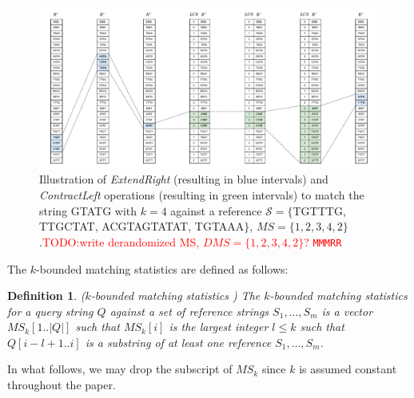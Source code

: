 \documentclass[unnumsec,webpdf,contemporary,large]{oup-authoring-template}%
\theoremstyle{thmstyleone}%
\theoremstyle{thmstyletwo}%
\theoremstyle{thmstylethree}%
\newtheorem{definition}{Definition}
\begin{document}
\begin{figure}
    \centering
    \includegraphics[scale=0.6]{fig/SBWT_search_LCS.drawio.pdf}
    \caption{Illustration of {\em ExtendRight} (resulting in blue intervals) and {\em ContractLeft} operations (resulting in green intervals) to match the string {\sf GTATG} with $k=4$ against a reference $\mathcal{S}= \{${\sf TGTTTG}, {\sf TTGCTAT}, {\sf ACGTAGTATAT}, {\sf TGTAAA}$\}$, $MS=\{ 1, 2, 3, 4, 2 \}$.\textcolor{red}{TODO:write derandomized MS, $DMS=\{1,2,3,4,2\}$? {\tt MMMRR}}}
    \label{fig:sbwt-search}
\end{figure}


The $k$-bounded matching statistics are defined as follows:

\begin{definition}\label{def:k-bounded-ms}
    ($k$-bounded matching statistics \cite{alanko2024finimizers})
    The $k$-bounded matching statistics for a query string $Q$ against a set of reference strings $S_1, \ldots, S_m$ is a vector $MS_k[1..|Q|]$ such that $MS_k[i]$ is the largest integer $l \leq k$ such that $Q[i-l+1..i]$ %
    is a substring of at least one reference $S_1, \ldots, S_m$.
\end{definition}

In what follows, we may drop the subscript of $MS_k$ since $k$ is assumed constant throughout the paper.
\end{document}

